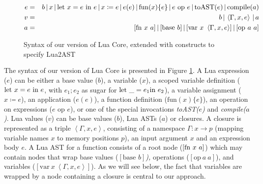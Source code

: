 \documentclass[english]{llncs}
\begin{document}
\begin{figure}[t]
\begin{eqnarray*}
e & = & b\,|\, x\,|\,\mbox{let \ensuremath{x=e}\ in\ \ensuremath{e}}\,|\, x\coloneqq e\,|\, e(e)\,|\,\mbox{fun}(x)\{e\}\,|\, e\mbox{ op }e\,|\,\mbox{toAST}(e)\,|\,\mbox{compile}(a)\\
v & = & b\,|\,\left\langle \Gamma,x,e\right\rangle \,|\, a\\
a & = & [\mbox{fn\ \ensuremath{x}\ \ensuremath{a}}]\,|\,[\mbox{base\ \ensuremath{b}}]\,|\,[\mbox{var}\ x\ \left\langle \Gamma,x,e\right\rangle ]\,|\,[\mbox{op\ \ensuremath{a}\ \ensuremath{a}}]
\end{eqnarray*}
\protect\caption{\label{fig:LuaCoreSyntax}Syntax of our version of Lua Core, extended
with constructs to specify Lua2AST}
\end{figure}


The syntax of our version of Lua Core is presented in Figure \ref{fig:LuaCoreSyntax}.
A Lua expression ($e$) can be either a base value ($b$), a variable
($x$), a scoped variable definition ($\mbox{let \ensuremath{x=e}\ in\ \ensuremath{e}}$,
with $e_{1};e_{2}$ as sugar for $\mbox{let \ensuremath{\_=e_{1}}in \ensuremath{e_{2}}}$),
a variable assignment ($x\coloneqq e$), an application ($e(e)$),
a function definition ($\mbox{fun}(x)\{e\}$), an operation on expressions
($e\mbox{ op }e$), or one of the special invocations \emph{toAST($e$)}
and \emph{compile($a$)}. Lua values ($v$) can be base values ($b$),
Lua ASTs ($a$) or closures. A closure is represented as a triple
$\left\langle \Gamma,x,e\right\rangle $, consisting of a namespace
$\Gamma:x\rightarrow p$ (mapping variable names $x$ to memory positions
$p$), an input argument $x$ and an expression body $e$. A Lua AST
for a function consists of a root node ($[\mbox{fn\ \ensuremath{x}\ \ensuremath{a}}]$)
which may contain nodes that wrap base values\emph{ }($[\mbox{base }b]$\emph{),
}operations ($[\mbox{op}\ a\ a]$), and variables ($[\mbox{var}\ x\ \left\langle \Gamma,x,e\right\rangle ]$).
As we will see below, the fact that variables are wrapped by a node
containing a closure is central to our approach.
\end{document}
